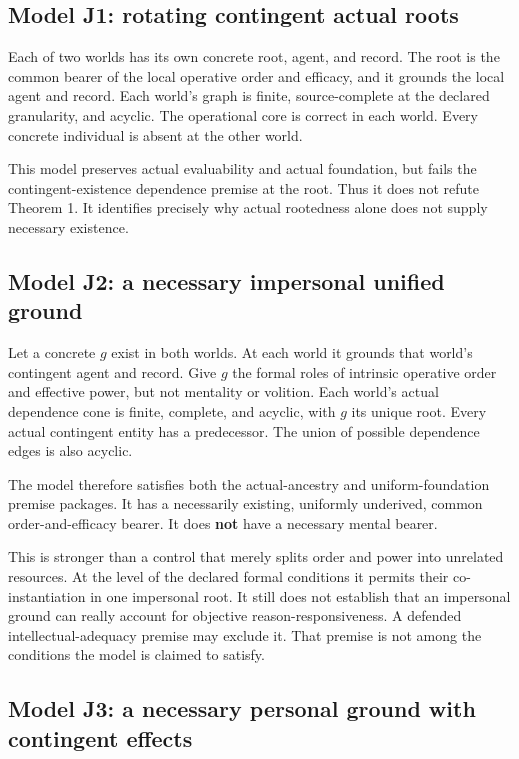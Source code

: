 \documentclass[11pt,a4paper]{article}
\begin{document}
\subsection{Model J1: rotating contingent actual
roots}\label{model-j1-rotating-contingent-actual-roots}

Each of two worlds has its own concrete root, agent, and record. The
root is the common bearer of the local operative order and efficacy, and
it grounds the local agent and record. Each world's graph is finite,
source-complete at the declared granularity, and acyclic. The
operational core is correct in each world. Every concrete individual is
absent at the other world.

This model preserves actual evaluability and actual foundation, but
fails the contingent-existence dependence premise at the root. Thus it
does not refute Theorem 1. It identifies precisely why actual rootedness
alone does not supply necessary existence.

\subsection{Model J2: a necessary impersonal unified
ground}\label{model-j2-a-necessary-impersonal-unified-ground}

Let a concrete \(g\) exist in both worlds. At each world it grounds that
world's contingent agent and record. Give \(g\) the formal roles of
intrinsic operative order and effective power, but not mentality or
volition. Each world's actual dependence cone is finite, complete, and
acyclic, with \(g\) its unique root. Every actual contingent entity has
a predecessor. The union of possible dependence edges is also acyclic.

The model therefore satisfies both the actual-ancestry and
uniform-foundation premise packages. It has a necessarily existing,
uniformly underived, common order-and-efficacy bearer. It does
\textbf{not} have a necessary mental bearer.

This is stronger than a control that merely splits order and power into
unrelated resources. At the level of the declared formal conditions it
permits their co-instantiation in one impersonal root. It still does not
establish that an impersonal ground can really account for objective
reason-responsiveness. A defended intellectual-adequacy premise may
exclude it. That premise is not among the conditions the model is
claimed to satisfy.

\subsection{Model J3: a necessary personal ground with contingent
effects}\label{model-j3-a-necessary-personal-ground-with-contingent-effects}
\end{document}
